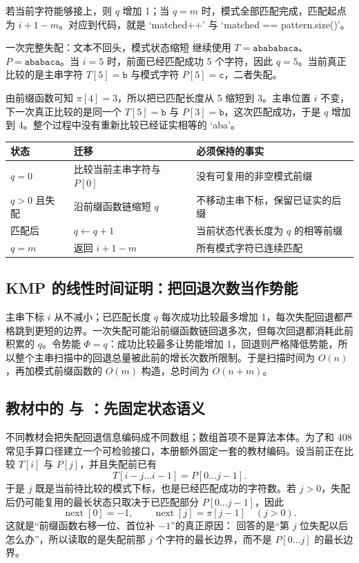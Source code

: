 \documentclass[UTF8,fontset=none,11pt,a4paper]{ctexart}
\begin{document}
若当前字符能够接上，则 $q$ 增加 1；当 $q=m$ 时，模式全部匹配完成，匹配起点为 $i+1-m$。对应到代码，就是 `matched++' 与 `matched == pattern.size()'。

\begin{examplebox}{一次完整失配：文本不回头，模式状态缩短}
继续使用 $T=\texttt{abababaca}$、$P=\texttt{ababaca}$。当 $i=5$ 时，前面已经匹配成功 5 个字符，因此 $q=5$。当前真正比较的是主串字符 $T[5]=\texttt{b}$ 与模式字符 $P[5]=\texttt{c}$，二者失配。

由前缀函数可知 $\pi[4]=3$，所以把已匹配长度从 5 缩短到 3。主串位置 $i$ 不变，下一次真正比较的是同一个 $T[5]=\texttt{b}$ 与 $P[3]=\texttt{b}$，这次匹配成功，于是 $q$ 增加到 4。整个过程中没有重新比较已经证实相等的 `aba'。
\end{examplebox}

\begin{center}\small
\begin{tabularx}{\linewidth}{L{2.3cm}YY}
\toprule
状态 & 迁移 & 必须保持的事实\\
\midrule
$q=0$ & 比较当前主串字符与 $P[0]$ & 没有可复用的非空模式前缀\\
$q>0$ 且失配 & 沿前缀函数链缩短 $q$ & 不移动主串下标，保留已证实的后缀\\
匹配后 & $q\leftarrow q+1$ & 当前状态代表长度为 $q$ 的相等前缀\\
$q=m$ & 返回 $i+1-m$ & 所有模式字符已连续匹配\\
\bottomrule
\end{tabularx}
\end{center}

\subsection{KMP 的线性时间证明：把回退次数当作势能}
主串下标 $i$ 从不减小；已匹配长度 $q$ 每次成功比较最多增加 1，每次失配回退都严格跳到更短的边界。一次失配可能沿前缀函数链回退多次，但每次回退都消耗此前积累的 $q$。令势能 $\Phi=q$：成功比较最多让势能增加 1，回退则严格降低势能，所以整个主串扫描中的回退总量被此前的增长次数所限制。于是扫描时间为 $O(n)$，再加模式前缀函数的 $O(m)$ 构造，总时间为 $O(n+m)$。

\subsection{教材中的  与 ：先固定状态语义}
不同教材会把失配回退信息编码成不同数组；数组首项不是算法本体。为了和 408 常见手算口径建立一个可检验接口，本册额外固定一套的教材编码。设当前正在比较 $T[i]$ 与 $P[j]$，并且失配前已有
\[
T[i-j\ldots i-1]=P[0\ldots j-1].
\]
于是 $j$ 既是当前待比较的模式下标，也是已经匹配成功的字符数。若 $j>0$，失配后仍可能复用的最长状态只取决于已匹配部分 $P[0\ldots j-1]$，因此
\[
\operatorname{next}[0]=-1,\qquad
\operatorname{next}[j]=\pi[j-1]\quad(j>0).
\]
这就是“前缀函数右移一位、首位补 $-1$”的真正原因： 回答的是“第 $j$ 位失配以后怎么办”，所以读取的是失配前那 $j$ 个字符的最长边界，而不是 $P[0\ldots j]$ 的最长边界。
\end{document}
